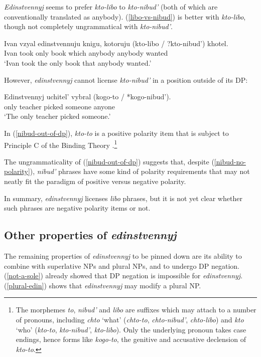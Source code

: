 \documentclass{article}
\begin{document}
\textit{Edinstvennyj} seems to prefer \textit{kto-libo} to \textit{kto-nibud'} (both of which are conventionally translated as anybody). (\ref{libo-vs-nibud}) is better with \textit{kto-libo}, though not completely ungrammatical with \textit{kto-nibud'}.

\begin{exe}
	\ex \label{libo-vs-nibud} \gll Ivan vzyal edinstvennuju knigu, kotoruju (kto-libo / ?kto-nibud') khotel.\\
	Ivan took only book which anybody {} anybody wanted\\
	\glt `Ivan took the only book that anybody wanted.'
\end{exe}

However, \textit{edinstvennyj} cannot license \textit{kto-nibud'} in a position outside of its DP:

\begin{exe}
	\ex \label{nibud-out-of-dp} \gll Edinstvennyj uchitel' vybral (kogo-to / *kogo-nibud').\\
	only teacher picked someone {} anyone\\
	\glt `The only teacher picked someone.'
\end{exe}

In (\ref{nibud-out-of-dp}), \textit{kto-to}	is a positive polarity item that is subject to Principle C of the Binding Theory \citep{russneg}.\footnote{The morphemes \textit{to}, \textit{nibud'} and \textit{libo} are suffixes which may attach to a number of pronouns, including \textit{chto} `what' (\textit{chto-to}, \textit{chto-nibud'}, \textit{chto-libo}) and \textit{kto} `who' (\textit{kto-to}, \textit{kto-nibud'}, \textit{kto-libo}). Only the underlying pronoun takes case endings, hence forms like \textit{kogo-to}, the genitive and accusative declension of \textit{kto-to}.}

The ungrammaticality of (\ref{nibud-out-of-dp}) suggests that, despite (\ref{nibud-no-polarity}), \textit{nibud'} phrases have some kind of polarity requirements that may not neatly fit the paradigm of positive versus negative polarity.

In summary, \textit{edinstvennyj} licenses \textit{libo} phrases, but it is not yet clear whether such phrases are negative polarity items or not.

\subsection{Other properties of \textit{edinstvennyj}}
The remaining properties of \textit{edinstvennyj} to be pinned down are its ability to combine with superlative NPs and plural NPs, and to undergo DP negation. (\ref{not-a-sole}) already showed that DP negation is impossible for \textit{edinstvennyj}. (\ref{plural-edin}) shows that \textit{edinstvennyj} may modify a plural NP.
\end{document}
